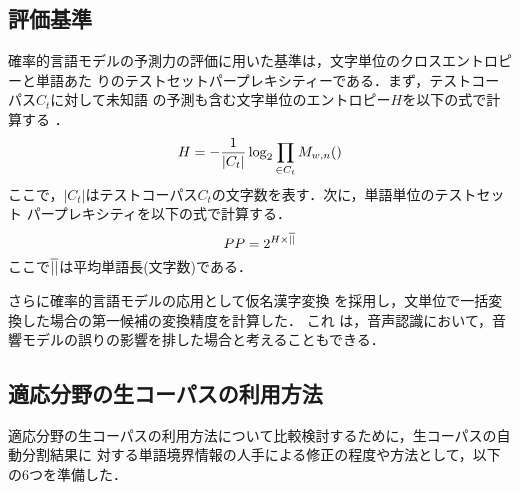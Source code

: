 \subsection{評価基準}

確率的言語モデルの予測力の評価に用いた基準は，文字単位のクロスエントロピーと単語あた
りのテストセットパープレキシティーである．まず，テストコーパス$C_{t}$に対して未知語
の予測も含む文字単位のエントロピー$H$を以下の式で計算する
\cite{An.Estimate.of.an.Upper.Bound.for.the.Entropy.of.English}．
\begin{displaymath}
  H = -\frac{1}{|C_{t}|}\log_{2} \prod_{\Bdma{w} \in C_{t}}M_{w,n}(\Bdma{w})
\end{displaymath}
ここで，$|C_{t}|$はテストコーパス$C_{t}$の文字数を表す．次に，単語単位のテストセット
パープレキシティを以下の式で計算する．
\begin{displaymath}
  PP = 2^{H\times\overline{|\Bdma{w}|}}
\end{displaymath}
ここで$\overline{|\Bdma{w}|}$は平均単語長(文字数)である．

さらに確率的言語モデルの応用として仮名漢字変換\cite{確率的モデルによる仮名漢字変換} 
を採用し，文単位で一括変換した場合の第一候補の変換精度を計算した\footnotemark．
これ
は，音声認識において，音響モデルの誤りの影響を排した場合と考えることもできる．



\subsection{適応分野の生コーパスの利用方法}

適応分野の生コーパスの利用方法について比較検討するために，生コーパスの自動分割結果に
対する単語境界情報の人手による修正の程度や方法として，以下の6つを準備した．

